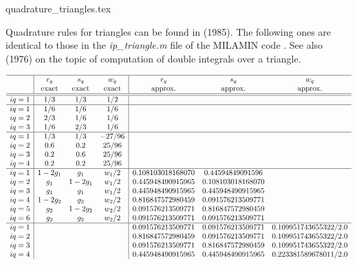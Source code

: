 \begin{flushright} {\tiny {\color{gray} quadrature\_triangles.tex}} \end{flushright}

Quadrature rules for triangles can be found in \textcite{duna85} (1985).
The following ones are identical to those in the {\sl ip\_triangle.m} 
file of the MILAMIN code \cite{daks08}. See also \textcite{leth76} (1976)
on the topic of computation of double integrals over a triangle.

{\small
\[
\begin{array}{c|ccc|ccc}
\hline
&r_q & s_q & w_q &r_q & s_q & w_q \\ 
&\text{exact} & \text{exact} & \text{exact} & \text{approx.}& \text{approx.}& \text{approx.}\\
\hline\hline
iq=1& 1/3 & 1/3 & 1/2\\
\hline
iq=1 & 1/6 & 1/6 & 1/6 \\
iq=2 & 2/3 & 1/6 & 1/6 \\
iq=3 & 1/6 & 2/3 & 1/6 \\
\hline
iq=1&1/3 & 1/3 & -27/96\\
iq=2&0.6 & 0.2 &  25/96\\
iq=3&0.2 & 0.6 &  25/96\\
iq=4&0.2 & 0.2 &  25/96\\
\hline
iq=1& 1-2g_1 & g_1 & w_1/2  &  0.108103018168070 & 0.44594849091596  &   \\
iq=2& g_1 & 1-2g_1 & w_1/2  &  0.445948490915965 & 0.108103018168070 &   \\
iq=3& g_1 & g_1    & w_1/2  &  0.445948490915965 & 0.445948490915965 &   \\
iq=4& 1-2g_2 & g_2 & w_2/2  &  0.816847572980459 & 0.091576213509771 &   \\
iq=5& g_2 & 1-2g_2 & w_2/2  &  0.091576213509771 & 0.816847572980459 &   \\
iq=6& g_2 & g_2    & w_2/2  &  0.091576213509771 & 0.091576213509771 &   \\
\hline
iq=1&&&&0.091576213509771 &  0.091576213509771    &    0.109951743655322/2.0 \\ 
iq=2&&&&0.816847572980459 &  0.091576213509771    &    0.109951743655322/2.0 \\
iq=3&&&&0.091576213509771 &  0.816847572980459    &    0.109951743655322/2.0 \\
iq=4&&&&0.445948490915965 &  0.445948490915965    &    0.223381589678011/2.0 \\

\end{array}\]}
